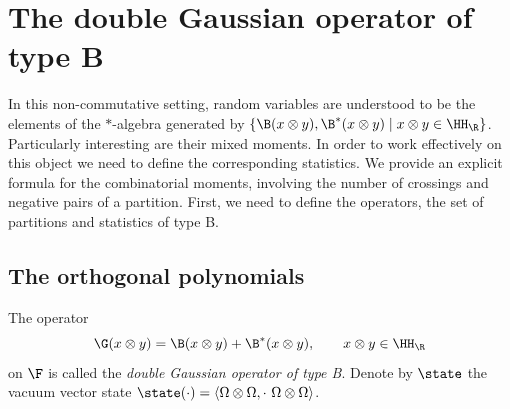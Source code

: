 \section{The double Gaussian operator of type B }
In this non-commutative setting, random variables are understood to be the elements of the
$\ast$-algebra generated by $\{\B(x\otimes y) ,\B^\ast(x\otimes y)\mid x\otimes y \in \HH_\R\}$. Particularly interesting are their mixed moments.
In order to work effectively on this object we need to define the corresponding statistics. We provide an explicit formula for the combinatorial moments, involving the number of crossings and negative pairs of a partition. First, we need to define the operators, the set of partitions and statistics of type B.

\subsection{The orthogonal polynomials}
\begin{Definition}
	The operator
	\begin{equation*}
		\G(x\otimes y)= \B(x\otimes y) +\B^\ast(x\otimes y),\qquad x\otimes y \in \HH_\R
	\end{equation*}
	on $\F$ is called the \emph{double Gaussian operator of type B}.
Denote by $\state$ the vacuum vector state $\state(\cdot)=\langle\Omega \otimes \Omega, \cdot\text{ } \Omega\otimes \Omega\rangle$.
\end{Definition}
